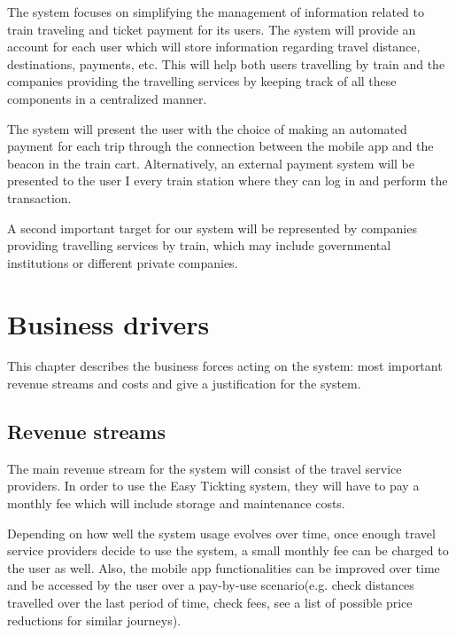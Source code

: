 
The system focuses on simplifying the management of information related to train traveling and ticket payment for its users. The system will provide an account for each user which will store information regarding travel distance, destinations, payments, etc. This will help both users travelling by train and the companies providing the travelling services by keeping track of all these components in a centralized manner. 

The system will present the user with the choice of making an automated payment for each trip through the connection between the mobile app and the beacon in the train cart. Alternatively, an external payment system will be presented to the user I every train station where they can log in and perform the transaction. 

A second important target for our system will be represented by companies providing travelling services by train, which may include governmental institutions or different private companies.

\section{Business drivers}
This chapter describes the business forces acting on the system: most important revenue streams and costs and give a justification for the system.

\subsection{Revenue streams}
The main revenue stream for the system will consist of the travel service providers. In order to use the Easy Tickting system, they will have to pay a monthly fee which will include storage and maintenance costs. 

Depending on how well the system usage evolves over time, once enough travel service providers decide to use the system, a small monthly fee can be charged to the user as well. Also, the mobile app functionalities can be improved over time and be accessed by the user over a pay-by-use scenario(e.g. check distances travelled over the last period of time, check fees, see a list of possible price reductions for similar journeys).

